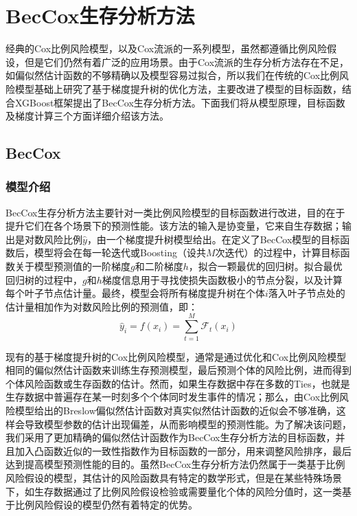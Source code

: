 \chapter{BecCox生存分析方法}

经典的Cox比例风险模型，以及Cox流派的一系列模型，虽然都遵循比例风险假设，但是它们仍然有着广泛的应用场景。由于Cox流派的生存分析方法存在不足，如偏似然估计函数的不够精确以及模型容易过拟合，所以我们在传统的Cox比例风险模型基础上研究了基于梯度提升树的优化方法，主要改进了模型的目标函数，结合XGBoost框架提出了BecCox生存分析方法。下面我们将从模型原理，目标函数及梯度计算三个方面详细介绍该方法。

\section{BecCox}

\subsection{模型介绍}

BecCox生存分析方法主要针对一类比例风险模型的目标函数进行改进，目的在于提升它们在各个场景下的预测性能。该方法的输入是协变量，它来自生存数据；输出是对数风险比例$\hat{y}$，由一个梯度提升树模型给出。在定义了BecCox模型的目标函数后，模型将会在每一轮迭代或Boosting（设共$M$次迭代）的过程中，计算目标函数关于模型预测值的一阶梯度$g$和二阶梯度$h$，拟合一颗最优的回归树。拟合最优回归树的过程中，$g$和$h$梯度信息用于寻找使损失函数极小的节点分裂，以及计算每个叶子节点估计量。最终，模型会将所有梯度提升树在个体$i$落入叶子节点处的估计量相加作为对数风险比例的预测值，即：$$
\hat{y}_i = f(x_i) = \sum_{t=1}^{M} \mathcal{F}_t (x_i)
$$

现有的基于梯度提升树的Cox比例风险模型，通常是通过优化和Cox比例风险模型相同的偏似然估计函数来训练生存预测模型，最后预测个体的风险比例，进而得到个体风险函数或生存函数的估计。然而，如果生存数据中存在多数的Ties，也就是生存数据中普遍存在某一时刻多个个体同时发生事件的情况；那么，由Cox比例风险模型给出的Breslow偏似然估计函数对真实似然估计函数的近似会不够准确，这样会导致模型参数的估计出现偏差，从而影响模型的预测性能。为了解决该问题，我们采用了更加精确的偏似然估计函数作为BecCox生存分析方法的目标函数，并且加入凸函数近似的一致性指数作为目标函数的一部分，用来调整风险排序，最后达到提高模型预测性能的目的。虽然BecCox生存分析方法仍然属于一类基于比例风险假设的模型，其估计的风险函数具有特定的数学形式，但是在某些特殊场景下，如生存数据通过了比例风险假设检验或需要量化个体的风险分值时，这一类基于比例风险假设的模型仍然有着特定的优势。

